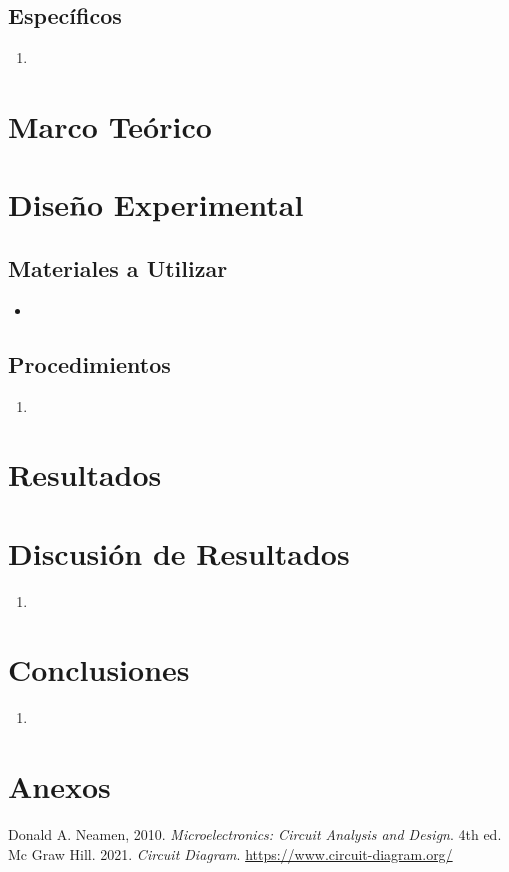 \documentclass[conference]{IEEEtran}
\begin{document}
\subsection{Específicos}
    \begin{enumerate}
        \item 
    \end{enumerate}
    
\section{Marco Teórico}
    
\section{Diseño Experimental}
    \subsection{Materiales a Utilizar}
        \begin{itemize}
    	\item 
    \end{itemize}

    \subsection{Procedimientos}
        \begin{enumerate}
            \item 
        \end{enumerate}
\section{Resultados}
    
\section{Discusión de Resultados}
\begin{enumerate}
    \item 
   
\end{enumerate}
\section{Conclusiones}
\begin{enumerate}
    \item 
\end{enumerate}

\section{Anexos}

\begin{thebibliography}{00}
 Donald A. Neamen, 2010. \textit{Microelectronics: Circuit Analysis and Design}. 4th ed. Mc Graw Hill.
 2021. \textit{Circuit Diagram}. \url{https://www.circuit-diagram.org/}
\end{thebibliography}
\end{document}
